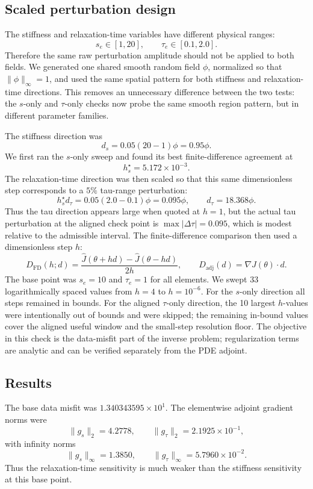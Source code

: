 \documentclass[11pt]{article}
\begin{document}
\subsection*{Scaled perturbation design}
The stiffness and relaxation-time variables have different physical ranges:
\[
s_e\in[1,20],\qquad \tau_e\in[0.1,2.0].
\]
Therefore the same raw perturbation amplitude should not be applied to both fields.
We generated one shared smooth random field \(\phi\), normalized so that \(\|\phi\|_\infty=1\), and used the same spatial pattern for both stiffness and relaxation-time directions.
This removes an unnecessary difference between the two tests: the \(s\)-only and \(\tau\)-only checks now probe the same smooth region pattern, but in different parameter families.

The stiffness direction was
\[
d_s = 0.05(20-1)\phi = 0.95\phi.
\]
We first ran the \(s\)-only sweep and found its best finite-difference agreement at
\[
h_s^\star=5.172\times10^{-3}.
\]
The relaxation-time direction was then scaled so that this same dimensionless step corresponds to a \(5\%\) tau-range perturbation:
\[
h_s^\star d_\tau = 0.05(2.0-0.1)\phi=0.095\phi,
\qquad
d_\tau = 18.368\phi.
\]
Thus the tau direction appears large when quoted at \(h=1\), but the actual tau perturbation at the aligned check point is \(\max|\Delta\tau|=0.095\), which is modest relative to the admissible interval.
The finite-difference comparison then used a dimensionless step \(h\):
\[
D_{\mathrm{FD}}(h;d)=
\frac{\widehat J(\theta+h d)-\widehat J(\theta-h d)}{2h},
\qquad
D_{\mathrm{adj}}(d)=\nabla \widehat J(\theta)\cdot d.
\]
The base point was \(s_e=10\) and \(\tau_e=1\) for all elements.
We swept 33 logarithmically spaced values from \(h=4\) to \(h=10^{-6}\).
For the \(s\)-only direction all steps remained in bounds.
For the aligned \(\tau\)-only direction, the 10 largest \(h\)-values were intentionally out of bounds and were skipped; the remaining in-bound values cover the aligned useful window and the small-step resolution floor.
The objective in this check is the data-misfit part of the inverse problem; regularization terms are analytic and can be verified separately from the PDE adjoint.

\subsection*{Results}
The base data misfit was \(1.340343595\times10^{1}\).
The elementwise adjoint gradient norms were
\[
\|g_s\|_2=4.2778,\qquad \|g_\tau\|_2=2.1925\times10^{-1},
\]
with infinity norms
\[
\|g_s\|_\infty=1.3850,\qquad \|g_\tau\|_\infty=5.7960\times10^{-2}.
\]
Thus the relaxation-time sensitivity is much weaker than the stiffness sensitivity at this base point.
\end{document}
